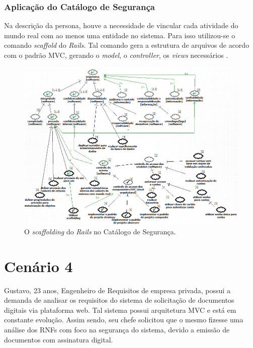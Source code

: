 \subsubsection{Aplicação do Catálogo de Segurança}

Na descrição da persona, houve a necessidade de vincular cada atividade do mundo real com ao menos uma entidade no sistema. Para isso utilizou-se o comando \textit{scaffold} do \textit{Rails}. Tal comando gera a estrutura de arquivos de acordo com o padrão MVC, gerando o \textit{model}, o \textit{controller}, os \textit{views} necessários \cite{railscommunity}. 

\begin{figure}[h!]
	\centering
	\includegraphics[keepaspectratio=true,scale=0.7]{figuras/catalogoPersona3.PNG}
	\caption{O \textit{scaffolding} do \textit{Rails} no Catálogo de Segurança.}
	\label{catalogoPersona3}
\end{figure}

\section{Cenário 4}
\label{subsec:persona4}

Gustavo, 23 anos, Engenheiro de Requisitos de empresa privada, possui a demanda de analisar os requisitos do sistema de solicitação de documentos digitais via plataforma web. Tal sistema possui arquitetura MVC e está em constante evolução. Assim sendo, seu chefe solicitou que o mesmo fizesse uma análise dos RNFs com foco na segurança do sistema, devido a emissão de documentos com assinatura digital. 

